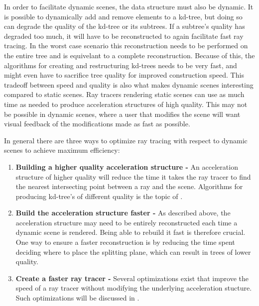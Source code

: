 In order to facilitate dynamic scenes, the data structure must also be
dynamic. It is possible to dynamically add and remove elements to a kd-tree, but
doing so can degrade the quality of the kd-tree or its subtrees. If a subtree's
quality has degraded too much, it will have to be reconstructed to again
facilitate fast ray tracing. In the worst case scenario this reconstruction
needs to be performed on the entire tree and is equivelant to a complete
reconstruction. Because of this, the algorithms for creating and restructuring
kd-trees needs to be very fast, and might even have to sacrifice tree quality
for improved construction speed. This tradeoff between speed and quality is also
what makes dynamic scenes interesting compared to static scenes. Ray tracers
rendering static scenes can use as much time as needed to produce acceleration
structures of high quality. This may not be possible in dynamic scenes, where a
user that modifies the scene will want visual feedback of the modifications made
as fast as possible.

In general there are three ways to optimize ray tracing with respect to dynamic
scenes to achieve maximum efficiency:

\begin{enumerate}
  \item \textbf{Building a higher quality acceleration structure -} An
    acceleration structure of higher quality will reduce the time it takes the
    ray tracer to find the nearest intersecting point between a ray and the
    scene. Algorithms for producing kd-tree's of different quality is the topic
    of .
  \item \textbf{Build the acceleration structure faster -} As described above,
    the acceleration structure may need to be entirely reconstructed each time a
    dynamic scene is rendered. Being able to rebuild it fast is therefore
    crucial. One way to ensure a faster reconstruction is by reducing the time
    spent deciding where to place the splitting plane, which can result in trees
    of lower quality.
  \item \textbf{Create a faster ray tracer -} Several optimizations exist that
    improve the speed of a ray tracer without modifying the underlying
    acceleration stucture. Such optimizations will be discussed in
    .
\end{enumerate}



